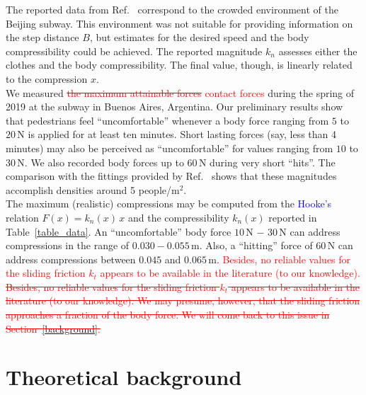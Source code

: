 \documentclass[preprint,12pt]{elsarticle}
\begin{document}
The reported data from Ref.~\cite{song_2019} correspond to the crowded 
environment of the Beijing subway. This environment was not suitable for 
providing information on the step distance $B$, but estimates for the 
desired speed and the body compressibility could be achieved. The reported 
magnitude $k_n$ assesses either the clothes and the body compressibility. The 
final value, though, is linearly related to the compression $x$. \\

We measured \textcolor{red}{\sout{the maximum attainable forces}
contact forces} during the spring of 2019 at the subway in Buenos Aires, 
Argentina. Our preliminary results show that pedestrians feel ``uncomfortable'' 
whenever a body force ranging from $5$ to $20\,$N is applied for at least ten 
minutes. Short lasting forces (say, less than 4 minutes) may also be perceived 
as ``uncomfortable'' for values ranging from $10$ to $30\,$N. We also recorded body 
forces up to $60\,$N during very short ``hits''. The comparison with the 
fittings provided by Ref.~\cite{song_2019} shows that these magnitudes 
accomplish densities around 5 people/m$^2$.     \\    

The maximum (realistic) compressions may be computed from the \textcolor{blue}{Hooke's} relation 
$F(x)=k_n(x)\,x$ and the compressibility $k_n(x)$ reported in Table~\ref{table_data}. 
An ``uncomfortable'' body force  $10\,$N $-$ $30\,$N can address compressions in the 
range of $0.030-0.055\,$m. Also, a ``hitting'' force of $60\,$N can address 
compressions between $0.045$ and $0.065\,$m. \textcolor{red}{
Besides, no reliable values for the sliding friction $k_t$ appears to be 
available in the literature (to our knowledge).}\\

\textcolor{red}{\sout{Besides, no reliable values for the sliding friction $k_t$ appears to be 
available in the literature (to our knowledge). We may presume, however, that 
the sliding friction approaches a fraction of the body force. We will come back 
to this issue in Section~\ref{background}.}} \\


\section{\label{background}Theoretical background}
\end{document}
